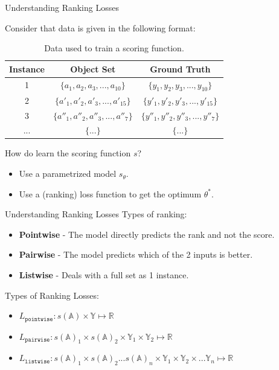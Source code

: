\documentclass{beamer}
\begin{document}
\begin{frame}[t]{Understanding Ranking Losses}

Consider that data is given in the following format:

\begin{table} [ht]
\centering
\begin{tabular}{ | c | c | c | }
  \toprule
  Instance & Object Set & Ground Truth \\ \midrule
  1 & $\{a_1, a_2, a_3, ... , a_{10}\}$  & $\{y_1, y_2, y_3, ... , y_{10}\}$  \\
  2 & $\{a'_1, a'_2, a'_3, ... , a'_{15}\}$ & $\{y'_1, y'_2, y'_3, ... , y'_{15}\}$  \\
  3 & $\{a''_1, a''_2, a''_3, ... , a''_{7}\}$ & $\{y''_1, y''_2, y''_3, ... , y''_{7}\}$  \\
  ... & $\{...\}$ & $\{...\}$ \\
  \bottomrule
\end{tabular}
\caption{Data used to train a scoring function.}
\label {tab:dataformat}
\end{table}

How do learn the scoring function $s$?
\begin{itemize}
\item Use a parametrized model $s_{\theta}$.
\item Use a (ranking) loss function to get the optimum $\theta^*$.
\end{itemize}

\end{frame}


\begin{frame}[t]{Understanding Ranking Losses}
Types of ranking:
\begin{itemize}
\item \textbf{Pointwise} - The model directly predicts the rank and not the score.
\item \textbf{Pairwise} - The model predicts which of the 2 inputs is better.
\item \textbf{Listwise} - Deals with a full set as 1 instance.
\end{itemize}

Types of Ranking Losses:
\begin{itemize}
\item
$
L_{\texttt{pointwise}} : s(\mathbb{A}) \times \mathbb{Y} \mapsto \mathbb{R}
$

\item
$
L_{\texttt{pairwise}} : s(\mathbb{A})_1 \times s(\mathbb{A})_2 \times \mathbb{Y}_1 \times \mathbb{Y}_2 \mapsto \mathbb{R}
$

\item
$
L_{\texttt{listwise}} : s(\mathbb{A})_1 \times s(\mathbb{A})_2 ...  s(\mathbb{A})_{n} \times \mathbb{Y}_1 \times \mathbb{Y}_2 \times ...  \mathbb{Y}_{n} \mapsto \mathbb{R}
$

\end{itemize}

\end{frame}
\end{document}

